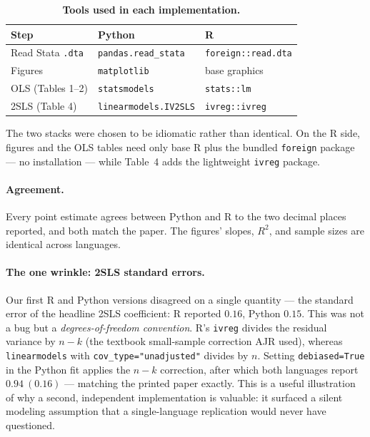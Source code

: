 \documentclass[11pt]{article}
\begin{document}
\begin{table}[H]
  \centering
  \caption*{\textbf{Tools used in each implementation.}}
  \small
  \begin{tabular}{lll}
    \toprule
    Step & Python & R \\
    \midrule
    Read Stata \texttt{.dta} & \texttt{pandas.read\_stata} & \texttt{foreign::read.dta} \\
    Figures                  & \texttt{matplotlib}        & base graphics \\
    OLS (Tables 1--2)        & \texttt{statsmodels}       & \texttt{stats::lm} \\
    2SLS (Table 4)           & \texttt{linearmodels.IV2SLS} & \texttt{ivreg::ivreg} \\
    \bottomrule
  \end{tabular}
\end{table}

\noindent The two stacks were chosen to be idiomatic rather than identical. On
the R side, figures and the OLS tables need only base R plus the bundled
\texttt{foreign} package --- no installation --- while Table~4 adds the
lightweight \texttt{ivreg} package.

\paragraph{Agreement.} Every point estimate agrees between Python and R to the
two decimal places reported, and both match the paper. The figures' slopes,
$R^2$, and sample sizes are identical across languages.

\paragraph{The one wrinkle: 2SLS standard errors.} Our first R and Python
versions disagreed on a single quantity --- the standard error of the headline
2SLS coefficient: R reported $0.16$, Python $0.15$. This was not a bug but a
\emph{degrees-of-freedom convention}. R's \texttt{ivreg} divides the residual
variance by $n-k$ (the textbook small-sample correction AJR used), whereas
\texttt{linearmodels} with \texttt{cov\_type="unadjusted"} divides by $n$.
Setting \texttt{debiased=True} in the Python fit applies the $n-k$ correction, after
which both languages report $0.94\ (0.16)$ --- matching the printed paper
exactly. This is a useful illustration of why a second, independent
implementation is valuable: it surfaced a silent modeling assumption that a
single-language replication would never have questioned.
\end{document}
